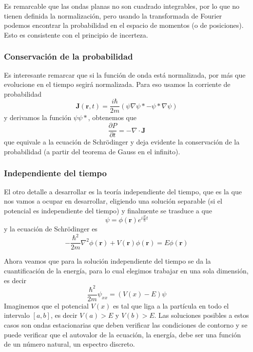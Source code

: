 Es remarcable que las ondas planas no son cuadrado integrables, por lo que no tienen definida la normalización, pero usando la transformada de Fourier podemos encontrar la probabilidad en el espacio de momentos (o de posiciones).
Esto es consistente con el principio de incerteza.

\subsubsection{Conservación de la probabilidad}
Es interesante remarcar que si la función de onda está normalizada, por más que evolucione en el tiempo segirá normalizada.
Para eso usamos la corriente de probabilidad
\begin{equation}
    \textbf{J}(\textbf{r}, t) = \frac{i \hbar}{2m} \left(\psi \nabla \psi* - \psi* \nabla \psi\right)
    \label{eq:corriente_proba}
\end{equation}
y derivamos la función $\psi \psi*$, obtenemos que
\begin{equation}
    \frac{\partial P}{\partial t} = - \nabla \cdot \textbf{J}
\end{equation}
que equivale a la ecuación de Schrödinger y deja evidente la conservación de la probabilidad (a partir del teorema de Gauss en el infinito).

\subsubsection{Independiente del tiempo}
El otro detalle a desarrollar es la teoría independiente del tiempo, que es la que nos vamos a ocupar en desarrollar, eligiendo una solución separable (si el potencial es independiente del tiempo) y finalmente se trasduce a que
\begin{equation}
    \psi = \phi(\textbf{r}) e^{i \frac{E}{\hbar} t}
\end{equation}
y la ecuación de Schrödinger es
\begin{equation}
    - \frac{\hbar^2}{2m} \nabla^2 \phi(\textbf{r}) + V(\textbf{r}) \phi(\textbf{r}) = E \phi(\textbf{r})
\end{equation}

Ahora veamos que para la solución independiente del tiempo se da la cuantificación de la energía, para lo cual elegimos trabajar en una sola dimensión, es decir
\[ \frac{\hbar^2}{2m} \psi_{xx} = (V(x) - E) \psi \]
Imaginemos que el potencial $V(x)$ es tal que liga a la partícula en todo el intervalo $[a, b]$, es decir $V(a) > E$ y $V(b) > E$. 
Las soluciones posibles a estos casos son ondas estacionarias que deben verificar las condiciones de contorno y se puede verificar que el autovalor de la ecuación, la energía, debe ser una función de un número natural, un espectro discreto.

